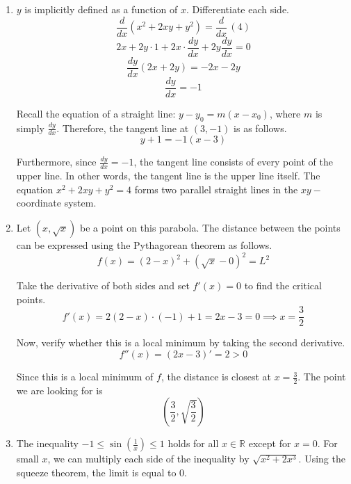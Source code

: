 \documentclass[a4paper, 12pt]{article}
\renewcommand{\headrulewidth}{0pt}
\begin{document}
\newpage
\pagestyle{fancy}
\renewcommand{\headrulewidth}{1pt}


\begin{enumerate}[leftmargin=*,label=\textbf{\arabic*.}]

\item $y$ is implicitly defined as a function of $x$. Differentiate each side.
\[\frac{d}{dx}\left(x^2+2xy+y^2\right)=\frac{d}{dx}\,(4)\]
\[2x+2y\cdot1+2x\cdot\frac{dy}{dx}+2y\frac{dy}{dx}=0\]
\[\frac{dy}{dx}(2x+2y)=-2x-2y\]
\[\frac{dy}{dx}=-1\]

Recall the equation of a straight line: $y-y_0=m(x-x_0)$, where $m$ is simply $\displaystyle \frac{dy}{dx}$. Therefore, the tangent line at $(3,-1)$ is as follows.
\[\boxed{y+1=-1(x-3)}\]

Furthermore, since $\displaystyle \frac{dy}{dx}=-1$, the tangent line consists of every point of the upper line. In other words, the tangent line is the upper line itself. The equation $x^2+2xy+y^2=4$ forms two parallel straight lines in the $xy-$coordinate system.

\vspace{1em}

\item Let $\left(x,\sqrt x\right)$ be a point on this parabola. The distance between the points can be expressed using the Pythagorean theorem as follows.
\[f(x)=(2-x)^2 + \left(\sqrt x - 0\right)^2=L^2\]

Take the derivative of both sides and set $\displaystyle f'(x)=0$ to find the critical points.
\begin{equation*}
f'(x)=2(2-x)\cdot(-1) + 1 = 2x-3=0 \implies x=\frac{3}2
\end{equation*}

Now, verify whether this is a local minimum by taking the second derivative.
\[f''(x)=(2x-3)'=2>0\]

Since this is a local minimum of $f$, the distance is closest at $\displaystyle x=\frac32$. The point we are looking for is
\[\boxed{\left(\frac32,\sqrt{\frac32}\right)}\]

\newpage

\item The inequality $\displaystyle-1 \leq \sin\left(\frac1x\right)\leq1$ holds for all $x\in\mathbb{R}$ except for $x=0$. For small $x$, we can multiply each side of the inequality by $\sqrt{x^2+2x^3}$. Using the squeeze theorem, the limit is equal to $0$.


\end{enumerate}
\end{document}
